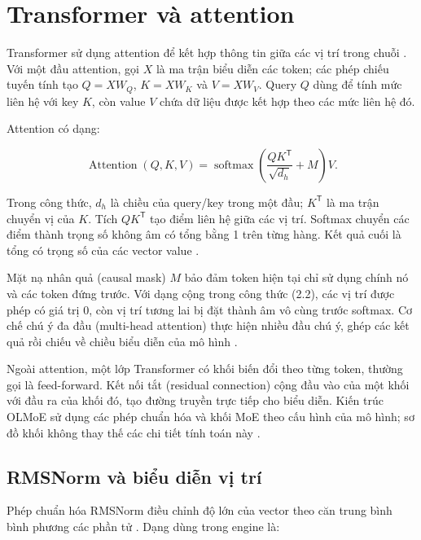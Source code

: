 \section{Transformer và attention}

Transformer sử dụng attention để kết hợp thông tin giữa các vị trí trong chuỗi \cite{vaswani_attention}. Với một đầu attention, gọi $X$ là ma trận biểu diễn các token; các phép chiếu tuyến tính tạo $Q=XW_Q$, $K=XW_K$ và $V=XW_V$. Query $Q$ dùng để tính mức liên hệ với key $K$, còn value $V$ chứa dữ liệu được kết hợp theo các mức liên hệ đó.

Attention có dạng:

\begin{equation}
\label{eq:2.2}
\operatorname{Attention}(Q,K,V)=\operatorname{softmax}\left(\frac{QK^\mathsf{T}}{\sqrt{d_h}}+M\right)V.
\end{equation}

Trong công thức, $d_h$ là chiều của query/key trong một đầu; $K^\mathsf{T}$ là ma trận chuyển vị của $K$. Tích $QK^\mathsf{T}$ tạo điểm liên hệ giữa các vị trí. Softmax chuyển các điểm thành trọng số không âm có tổng bằng 1 trên từng hàng. Kết quả cuối là tổng có trọng số của các vector value \cite[mục 3.2.1]{vaswani_attention}.

Mặt nạ nhân quả (causal mask) $M$ bảo đảm token hiện tại chỉ sử dụng chính nó và các token đứng trước. Với dạng cộng trong công thức (2.2), các vị trí được phép có giá trị 0, còn vị trí tương lai bị đặt thành âm vô cùng trước softmax. Cơ chế chú ý đa đầu (multi-head attention) thực hiện nhiều đầu chú ý, ghép các kết quả rồi chiếu về chiều biểu diễn của mô hình \cite[mục 3.2.2]{vaswani_attention}.

Ngoài attention, một lớp Transformer có khối biến đổi theo từng token, thường gọi là feed-forward. Kết nối tắt (residual connection) cộng đầu vào của một khối với đầu ra của khối đó, tạo đường truyền trực tiếp cho biểu diễn. Kiến trúc OLMoE sử dụng các phép chuẩn hóa và khối MoE theo cấu hình của mô hình; sơ đồ khối không thay thế các chi tiết tính toán này \cite{olmoe}.

\subsection{RMSNorm và biểu diễn vị trí}

Phép chuẩn hóa RMSNorm điều chỉnh độ lớn của vector theo căn trung bình bình phương các phần tử \cite{rmsnorm}. Dạng dùng trong engine là:

